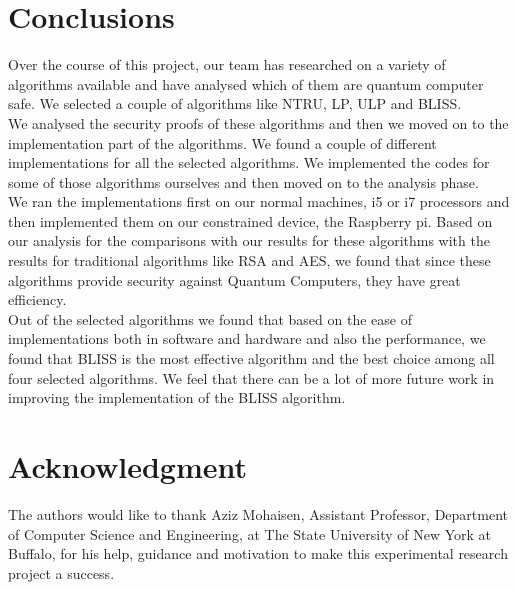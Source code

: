 \documentclass[conference]{IEEEtran}
\begin{document}
\section{Conclusions}

Over the course of this project, our team has researched on a variety of algorithms available and have analysed which of them are quantum computer safe. We selected a couple of algorithms like NTRU, LP, ULP and BLISS.\\
We analysed the security proofs of these algorithms and then we moved on to the implementation part of the algorithms. We found a couple of different implementations for all the selected algorithms. We implemented the codes for some of those algorithms ourselves and then moved on to the analysis phase.\\

We ran the implementations first on our normal machines, i5 or i7 processors and then implemented them on our constrained device, the Raspberry pi.
Based on our analysis for the comparisons with our results for these algorithms with the results for traditional algorithms like RSA and AES, we found that since these algorithms provide security against Quantum Computers, they have great efficiency.\\
Out of the selected algorithms we found that based on the ease of implementations both in software and hardware and also the performance, we found that BLISS is the most effective algorithm and the best choice among all four selected algorithms.
We feel that there can be a lot of more future work in improving the implementation of the BLISS algorithm.\\




\section*{Acknowledgment}


The authors would like to thank Aziz Mohaisen, Assistant Professor, Department of Computer Science and Engineering, at The State University of New York at Buffalo, for his help, guidance and motivation to make this experimental research project a success.


\ifCLASSOPTIONcaptionsoff
  \newpage
\fi



\end{document}
